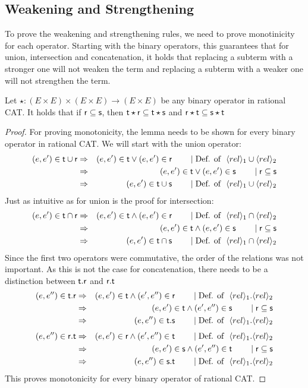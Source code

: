 \documentclass[a4paper,twoside,12pt, english]{article}
\begin{document}
\subsection{Weakening and Strengthening}
To prove the weakening and strengthening rules, we need to prove monotinicity for each operator. Starting with the binary operators, this guarantees that for union, intersection and concatenation, it holds that replacing a subterm with a stronger one will not weaken the term and replacing a subterm with a weaker one will not strengthen the term.
\begin{lemma}\label{lem:bmono} Let $\star: (E\times E) \times (E \times E) \rightarrow (E \times E)$ be any binary operator in rational CAT. It holds that if $\sf r \subseteq s$, then $\sf t \star r \subseteq t \star s$ and $\sf r \star t \subseteq s \star t$ \end{lemma} 
\begin{proof}
For proving monotonicity, the lemma needs to be shown for every binary operator in rational CAT.
We will start with the union operator:
\begin{eqnarray*}
(e,e') \in \sf t \cup r &\Rightarrow & (e,e') \in \textsf{\upshape t} \lor (e,e') \in \textsf{\upshape r} \qquad \mid \text{Def. of }~ \langle rel \rangle_1 \cup \langle rel \rangle_2 \\
& \Rightarrow & (e,e') \in \textsf{\upshape t} \lor (e,e') \in \sf s \qquad \mid r \subseteq s \\
&\Rightarrow & (e,e') \in \textsf{\upshape t} \cup \textsf{\upshape s} \qquad \mid \text{Def. of }~ \langle rel \rangle_1 \cup \langle rel \rangle_2
\end{eqnarray*}
Just as intuitive as for union is the proof for intersection:
\begin{eqnarray*}
(e,e') \in \sf t \cap r &\Rightarrow & (e,e') \in \textsf{\upshape t} \land (e,e') \in \textsf{\upshape r} \qquad \mid \text{Def. of }~ \langle rel \rangle_1 \cap \langle rel \rangle_2\\
& \Rightarrow & (e,e') \in \textsf{\upshape t} \land (e,e') \in \sf s \qquad \mid r \subseteq s \\
&\Rightarrow & (e,e') \in \textsf{\upshape t} \cap \textsf{\upshape s} \qquad \mid \text{Def. of }~ \langle rel \rangle_1 \cap \langle rel \rangle_2
\end{eqnarray*}
Since the first two operators were commutative, the order of the relations was not important. As this is not the case for concatenation, there needs to be a distinction between $\sf t.r$ and $\sf r.t$
\begin{eqnarray*}
(e,e'') \in \sf t.r &\Rightarrow & (e,e') \in \textsf{\upshape t} \land (e',e'') \in \textsf{\upshape r} \qquad \mid \text{Def. of }~ \langle rel \rangle_1.\langle rel \rangle_2\\
& \Rightarrow & (e,e') \in \textsf{\upshape t} \land (e',e'') \in \sf s \qquad \mid r \subseteq s \\
&\Rightarrow & (e,e'') \in \textsf{\upshape t}.\textsf{\upshape s} \qquad \mid \text{Def. of }~ \langle rel \rangle_1.\langle rel \rangle_2
\end{eqnarray*}
\begin{eqnarray*}
(e,e'') \in \sf r.t &\Rightarrow & (e,e') \in \textsf{\upshape r} \land (e',e'') \in \textsf{\upshape t} \qquad \mid \text{Def. of }~ \langle rel \rangle_1.\langle rel \rangle_2 \\
& \Rightarrow & (e,e') \in \textsf{\upshape s} \land (e',e'') \in \sf t \qquad \mid r \subseteq s \\
&\Rightarrow & (e,e'') \in \textsf{\upshape s}.\textsf{\upshape t} \qquad \mid \text{Def. of }~ \langle rel \rangle_1.\langle rel \rangle_2
\end{eqnarray*}
This proves monotonicity for every binary operator of rational CAT.
\end{proof}
\end{document}
